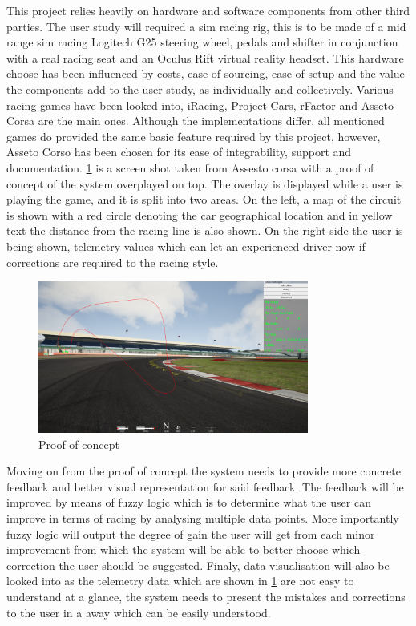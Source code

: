 \documentclass{article}
\begin{document}
This project relies heavily on hardware and software components from other third parties. The user study will required a sim racing rig, this is to be made of a mid range sim racing Logitech G25 steering wheel, pedals and shifter in conjunction with a real racing seat and an Oculus Rift virtual reality headset. This hardware choose has been influenced by costs, ease of sourcing, ease of setup and the value the components add to the user study, as individually and collectively. Various racing games have been looked into, iRacing, Project Cars, rFactor and Asseto Corsa are the main ones. Although the implementations differ, all mentioned games do provided the same basic feature required by this project, however, Asseto Corso has been chosen for its ease of integrability, support and documentation. \ref{fig:ProofOfConcept} is a screen shot taken from Assesto corsa with a proof of concept of the system overplayed on top. The overlay is displayed while a user is playing the game, and it is split into two areas. On the left, a map of the circuit is shown with a red circle denoting the car geographical location and in yellow text the distance from the racing line is also shown. On the right side the user is being shown, telemetry values which can let an experienced driver now if corrections are required to the racing style.

\begin{figure}[!htb]
	\centering
	\includegraphics[height=5cm]{Proofofconcept}
	\caption{Proof of concept}
	\label{fig:ProofOfConcept}
\end{figure}

Moving on from the proof of concept the system needs to provide more concrete feedback and better visual representation for said feedback. The feedback will be improved by means of fuzzy logic which is to determine what the user can improve in terms of racing by analysing multiple data points. More importantly fuzzy logic will output the degree of gain the user will get from each minor improvement from which the system will be able to better choose which correction the user should be suggested. Finaly, data visualisation will also be looked into as the telemetry data which are shown in \ref{fig:ProofOfConcept} are not easy to understand at a glance, the system needs to present the mistakes and corrections to the user in a away which can be easily understood. 
\end{document}
